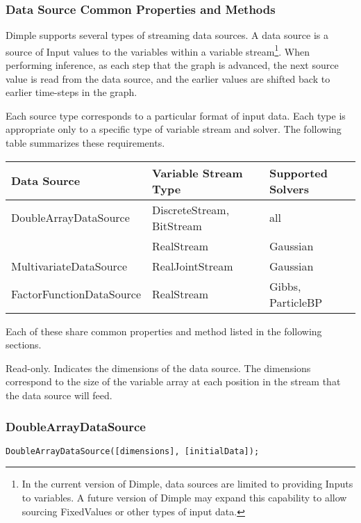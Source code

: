 \subsubsection{Data Source Common Properties and Methods}
\label{sec:DataSource}

Dimple supports several types of streaming data sources.  A data source is a source of Input values to the variables within a variable stream\footnote{In the current version of Dimple, data sources are limited to providing Inputs to variables.  A future version of Dimple may expand this capability to allow sourcing FixedValues or other types of input data.}.  When performing inference, as each step that the graph is advanced, the next source value is read from the data source, and the earlier values are shifted back to earlier time-steps in the graph.

Each source type corresponds to a particular format of input data.  Each type is appropriate only to a specific type of variable stream and solver.  The following table summarizes these requirements.

\begin{longtable} {l | l | l}
Data Source & Variable Stream Type & Supported Solvers \\
\hline
\endhead
DoubleArrayDataSource & DiscreteStream, BitStream & all \\
 & RealStream & Gaussian \\
MultivariateDataSource & RealJointStream & Gaussian \\
FactorFunctionDataSource & RealStream & Gibbs, ParticleBP \\
\end{longtable} 

Each of these share common properties and method listed in the following sections.


\ifmatlab
{}

Read-only.  Indicates the dimensions of the data source.  The dimensions correspond to the size of the variable array at each position in the stream that the data source will feed.
\fi

\subsubsection{DoubleArrayDataSource}


\ifmatlab
\begin{lstlisting}
DoubleArrayDataSource([dimensions], [initialData]);
\end{lstlisting}

